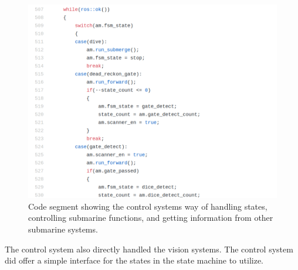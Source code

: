 \begin{figure}
\centering
\includegraphics[width=150mm]{Figures/DirectStateHandling}
\decoRule
\caption[Direct State Handling]{Code segment showing the control systems way of handling states, controlling submarine functions, and getting information from other submarine systems.}
\label{fig:DirectStateHandling}
\end{figure}

The control system also directly handled the vision systems. The control system did offer a simple interface for the states in the state machine to utilize.

